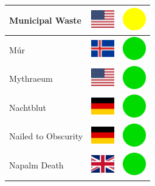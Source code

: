 \documentclass[12pt, a4paper, twoside]{report}
\begin{document}
\begin{center}
\begin{longtable}{|p{5cm}|p{2cm}|p{2cm}|}
Municipal Waste & \includegraphics[width=1cm]{4x3/us} & \includegraphics[width=1cm]{likes/m} \\ \hline
Múr & \includegraphics[width=1cm]{4x3/is} & \includegraphics[width=1cm]{likes/y} \\ \hline
Mythraeum & \includegraphics[width=1cm]{4x3/us} & \includegraphics[width=1cm]{likes/y} \\ \hline
Nachtblut & \includegraphics[width=1cm]{4x3/de} & \includegraphics[width=1cm]{likes/y} \\ \hline
Nailed to Obscurity & \includegraphics[width=1cm]{4x3/de} & \includegraphics[width=1cm]{likes/y} \\ \hline
Napalm Death & \includegraphics[width=1cm]{4x3/gb} & \includegraphics[width=1cm]{likes/y} \\ \hline

\end{longtable}
\end{center}
\end{document}
